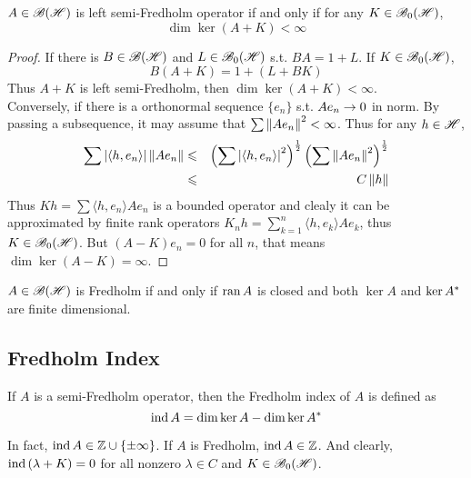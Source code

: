 \documentclass[a4paper,11pt]{report}
\begin{document}
\begin{thm}
	$A \in \mathscr{B(H)}$ is left semi-Fredholm operator if and only if for any $K \in \mathscr{B}_{0}\mathscr{(H)}$,
	\begin{equation*}
		\dim{\ker{(A+K)}} < \infty
	\end{equation*}
\end{thm}
\begin{proof}
	If there is $B \in \mathscr{B(H)}$ and $L \in \mathscr{B}_{0}\mathscr{(H)}$ s.t. $BA = 1+L$. If $K \in \mathscr{B}_{0}\mathscr{(H)}$, 
	\begin{equation*}
		B(A+K) = 1 + (L + BK)
	\end{equation*}
	Thus $A+K$ is left semi-Fredholm, then $\dim{\ker{(A+K)}} < \infty$.\\
	Conversely, if there is a orthonormal sequence $\{e_n\}$ s.t. $Ae_n \rightarrow 0$ in norm. By passing a subsequence, it may assume that $\sum \left\lVert Ae_n\right\lVert^2 < \infty$. Thus for any $h \in \mathscr{H}$, 
	\begin{eqnarray*}
		\sum \left\lvert\langle h,e_n \rangle\right\lvert\left\lVert Ae_n\right\lVert &\leqslant& \left(\sum \left\lvert\langle h,e_n \rangle\right\lvert^2\right)^{\frac{1}{2}}\left(\sum \left\lVert Ae_n\right\lVert^2\right)^{\frac{1}{2}} \\
		&\leqslant& C\left\lVert h\right\lVert
	\end{eqnarray*}
	Thus $Kh = \sum \langle h,e_n \rangle Ae_n$ is a bounded operator and clealy it can be approximated by finite rank operators $K_nh=\sum_{k=1}^n \langle h,e_k \rangle Ae_k$, thus $K \in \mathscr{B}_{0}\mathscr{(H)}$. But $(A-K)e_n = 0$ for all $n$, that means $\dim{\ker{(A-K)}} = \infty$.
\end{proof}

\begin{cor}
	$A \in \mathscr{B(H)}$ is Fredholm if and only if $\operatorname{ran}{A}$ is closed and both $\ker{A}$ and $\ker{A^{*}}$ are finite dimensional.
\end{cor}

\subsection{Fredholm Index}

\begin{defn}
	If $A$ is a semi-Fredholm operator, then the Fredholm index of $A$ is defined as
	\begin{equation*}
		\operatorname{ind}{A} = \dim{\ker{A}} - \dim{\ker{A^{*}}}
	\end{equation*}
\end{defn}
\begin{rem}
	In fact, $\operatorname{ind}{A} \in \mathbb{Z} \cup \{\pm \infty\}$. If $A$ is Fredholm, $\operatorname{ind}{A} \in \mathbb{Z}$. And clearly, $\operatorname{ind}{(\lambda+K)} = 0$ for all nonzero $\lambda \in C$ and $K \in \mathscr{B}_{0}\mathscr{(H)}$.
\end{rem}
\end{document}

